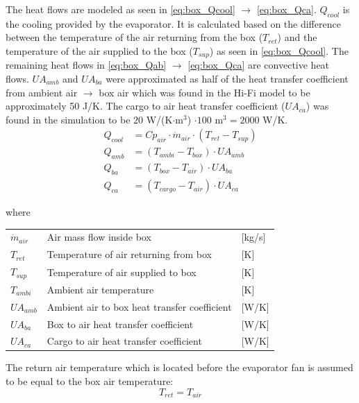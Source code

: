 \medskip
The heat flows are modeled as seen in \cref{eq:box_Qcool} $\rightarrow$ \cref{eq:box_Qca}. $Q_{cool}$ is the cooling provided by the evaporator. It is calculated based on the difference between the temperature of the air returning from the box ($T_{ret}$) and the temperature of the air supplied to the box ($T_{sup}$) as seen in \cref{eq:box_Qcool}. The remaining heat flows in \cref{eq:box_Qab} $\rightarrow$ \cref{eq:box_Qca} are convective heat flows. $U A_{amb}$ and $U A_{ba}$ were approximated as half of the heat transfer coefficient from ambient air $\rightarrow$ box air which was found in the Hi-Fi model to be approximately 50 \si{J}/\si{K}. The cargo to air heat transfer coefficient ($U A_{ca}$) was found in the simulation to be $20$ \si{W}/(\si{K}$\cdot$\si{m}$^3$) $\cdot 100$ \si{m}$^3 = 2000$ \si{W}/\si{K}.
\begin{align}
	Q_{cool}   & = Cp_{air} \cdot \dot{m}_{air} \cdot (T_{ret} - T_{sup})	\label{eq:box_Qcool} \\
	Q_{amb}    & = (T_{ambi} - T_{box}) \cdot U A_{amb}						\label{eq:box_Qab}   \\
	Q_{ba}     & = (T_{box} - T_{air}) \cdot U A_{ba}						\label{eq:box_Qba}   \\
	Q_{ca}     & = (T_{cargo} - T_{air}) \cdot U A_{ca}                  	\label{eq:box_Qca}
\end{align}

where
\smallskip
\begin{center}
	\begin{tabular}{l p{8cm} l}
		$\dot{m}_{air}$ & Air mass flow inside box                     & [\si{kg}/{\si{s}}] \\
		$T_{ret}$       & Temperature of air returning from box        & [\si{K}]           \\
		$T_{sup}$       & Temperature of air supplied to box           & [\si{K}]           \\
		$T_{ambi}$      & Ambient air temperature                      & [\si{K}]           \\
		$U A_{amb}$     & Ambient air to box heat transfer coefficient & [\si{W}/\si{K}]    \\
		$U A_{ba}$      & Box to air heat transfer coefficient         & [\si{W}/\si{K}]    \\
		$U A_{ca}$      & Cargo to air heat transfer coefficient       & [\si{W}/\si{K}]
	\end{tabular}
\end{center}


The return air temperature which is located before the evaporator fan is assumed to be equal to the box air temperature:
\medskip
\begin{equation} \label{eq:box_Tref}
	T_{ret} = T_{air}
\end{equation}



